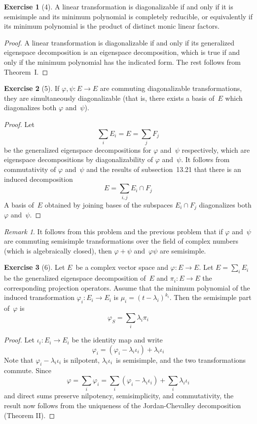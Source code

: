 \documentclass[letterpaper,12pt]{article}
\newcommand{\sect}{\cap}
\theoremstyle{definition}
\newtheorem*{exer}{Exercise}
\theoremstyle{remark}
\newtheorem*{rmk}{Remark}
\begin{document}
\begin{exer}[4]
A linear transformation is diagonalizable if and only if it is semi\-simple and its minimum polynomial is completely reducible, or equivalently if its minimum polynomial is the product of distinct monic linear factors.
\end{exer}
\begin{proof}
A linear transformation is diagonalizable if and only if its generalized eigenspace decomposition is an eigenspace decomposition, which is true if and only if the minimum polynomial has the indicated form. The rest follows from Theorem~I.
\end{proof}

\begin{exer}[5]
If \(\varphi,\psi:E\to E\) are commuting diagonalizable transformations, they are simultaneously diagonalizable (that is, there exists a basis of~\(E\) which diagonalizes both \(\varphi\) and~\(\psi\)).
\end{exer}
\begin{proof}
Let
\[\sum_i E_i=E=\sum_j F_j\]
be the generalized eigenspace decompositions for \(\varphi\) and~\(\psi\) respectively, which are eigenspace decompositions by diagonalizability of \(\varphi\) and~\(\psi\). It follows from commutativity of \(\varphi\) and~\(\psi\) and the results of subsection~13.21 that there is an induced decomposition
\[E=\sum_{i,j}E_i\sect F_j\]
A basis of~\(E\) obtained by joining bases of the subspaces \(E_i\sect F_j\) diagonalizes both \(\varphi\) and~\(\psi\).
\end{proof}

\begin{rmk}
It follows from this problem and the previous problem that if \(\varphi\) and~\(\psi\) are commuting semisimple transformations over the field of complex numbers (which is algebraically closed), then \(\varphi+\psi\) and~\(\varphi\psi\) are semisimple.
\end{rmk}

\begin{exer}[6]
Let \(E\)~be a complex vector space and \(\varphi:E\to E\). Let \(E=\sum_i E_i\) be the generalized eigenspace decomposition of~\(E\) and \(\pi_i:E\to E\) the corresponding projection operators. Assume that the minimum polynomial of the induced transformation \(\varphi_i:E_i\to E_i\) is \(\mu_i=(t-\lambda_i)^{k_i}\). Then the semisimple part of~\(\varphi\) is
\[\varphi_S=\sum_i\lambda_i\pi_i\]
\end{exer}
\begin{proof}
Let \(\iota_i:E_i\to E_i\) be the identity map and write
\[\varphi_i=(\varphi_i-\lambda_i\iota_i)+\lambda_i\iota_i\]
Note that \(\varphi_i-\lambda_i\iota_i\) is nilpotent, \(\lambda_i\iota_i\)~is semisimple, and the two transformations commute. Since
\[\varphi=\sum_i\varphi_i=\sum_i(\varphi_i-\lambda_i\iota_i)+\sum_i\lambda_i\iota_i\]
and direct sums preserve nilpotency, semisimplicity, and commutativity, the result now follows from the uniqueness of the Jordan-Chevalley decomposition (Theorem II).
\end{proof}
\end{document}
